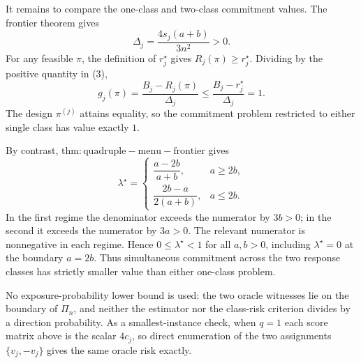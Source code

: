 It remains to compare the one-class and two-class commitment values.  The frontier theorem gives
\[
 \Delta_j=\frac{4s_j(a+b)}{3n^2}>0. \tag{3}
\]
For any feasible \(\pi\), the definition of \(r_j^\star\) gives \(R_j(\pi)\geq r_j^\star\).  Dividing by the positive quantity in (3),
\[
 g_j(\pi)=\frac{B_j-R_j(\pi)}{\Delta_j}
 \leq\frac{B_j-r_j^\star}{\Delta_j}=1.
\]
The design \(\pi^{(j)}\) attains equality, so the commitment problem restricted to either single class has value exactly \(1\).

By contrast, \(\mathrm{thm:quadruple-menu-frontier}\) gives
\[
 \lambda^\star=
 \begin{cases}
 \dfrac{a-2b}{a+b},&a\geq2b,\\[6pt]
 \dfrac{2b-a}{2(a+b)},&a\leq2b.
 \end{cases}
\]
In the first regime the denominator exceeds the numerator by \(3b>0\); in the second it exceeds the numerator by \(3a>0\).  The relevant numerator is nonnegative in each regime.  Hence \(0\leq\lambda^\star<1\) for all \(a,b>0\), including \(\lambda^\star=0\) at the boundary \(a=2b\).  Thus simultaneous commitment across the two response classes has strictly smaller value than either one-class problem.

No exposure-probability lower bound is used: the two oracle witnesses lie on the boundary of \(\Pi_n\), and neither the estimator nor the class-risk criterion divides by a direction probability.  As a smallest-instance check, when \(q=1\) each score matrix above is the scalar \(4c_j\), so direct enumeration of the two assignments \(\{v_j,-v_j\}\) gives the same oracle risk exactly.